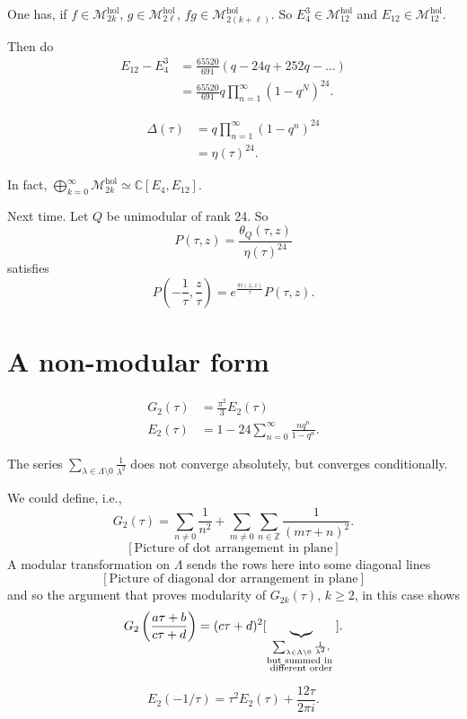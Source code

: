\noindent
One has, if $f \in
\mathcal{M}_{2k}^{\text{hol}}$,
$g \in \mathcal{M}_{2\ell}^{\text{hol}}$,
$fg \in
\mathcal{M}^{\text{hol}}_{2(k+\ell)}$.
So $E^3_4 \in \mathcal{M}^{\text{hol}}_{12}$
and
$E_{12}\in \mathcal{M}_{12}^{\text{hol}}$.

Then do
$$
\begin{aligned}
E_{12}-E^3_4&=\frac{65520}{691}(q-24q+252q-
\ldots)\\
&=\frac{65520}{691}q\prod_{n=1}^\infty(1-q^N)
^{24}.
\end{aligned}
$$

\begin{remark}
\label{remark-dedekind}
$$
\begin{aligned}
\Delta(\tau)&=q\prod_{n=1}^\infty(1-q^n)^{24}
\\
&=\eta(\tau)^{24}.
\end{aligned}
$$

\noindent
In fact,
$\bigoplus_{k=0}^\infty\mathcal{M}_{2k}
^{\text{hol}}
\simeq\mathbb{C}[E_4,E_{12}]$.
\end{remark}

\medskip\noindent
Next time. Let $Q$ be unimodular of rank 24.
So
$$
P(\tau,z)=\frac{\theta_Q(\tau,z)}{\eta(\tau)
^{24}}
$$
satisfies
$$
P\left(-\frac{1}{\tau},\frac{z}{\tau}\right)
=e^{\frac{\pi i (z,z)}{\tau}}P(\tau,z).
$$

\section{A non-modular form}
\label{section-a-non-modular-form}

\noindent
$$
\begin{aligned}
G_2(\tau)&=\frac{\pi^2}{3}E_2(\tau)\\
E_2(\tau)&=1-24\sum_{n=0}^\infty\frac{n
q^n}{1-q^n}.
\end{aligned}
$$

\noindent
The series $\sum_{\lambda \in
\Lambda\setminus 0}\frac{1}{\lambda^2}$
does not converge absolutely, but converges
conditionally.

We could define, i.e.,
$$
G_2(\tau)=\sum_{ n \neq 0}\frac{1}{n^2}
+\sum_{m \neq 0}\sum_{n \in \mathbb{Z}}
\frac{1}{(m\tau+n)^2}.
$$
$$
[\text{Picture of dot arrangement in plane}]
$$
A modular transformation on $\Lambda$
sends the rows here into some diagonal lines
$$
[\text{Picture of diagonal dor arrangement in
plane}]
$$
and so the argument that proves modularity of
$G_{2k}(\tau)$, $k\geq 2$, in this case shows
$$
G_2\left(\frac{a\tau+b}{c\tau+d}\right)
=(c\tau+d)^2[\underbrace{\leavevmode}_{
\substack{\sum_{\lambda \in \Lambda \setminus
0}\frac{1}{\lambda^2}, \\
 \text{but summed in }\\
\text{different order}}}].
$$
\begin{proposition}
\label{proposition-e2}
$$
E_2(-1/\tau)=\tau^2E_2(\tau)+\frac{12\tau}
{2\pi
i}.
$$
\end{proposition}

